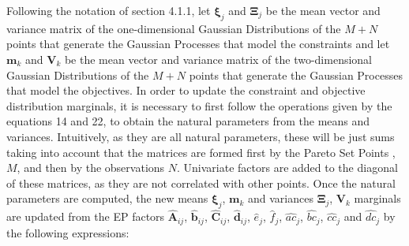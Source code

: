 \documentclass[review,preprint,12pt]{elsarticle}
\begin{document}
Following the notation of section 4.1.1, let $\boldsymbol{\xi}_j$ and $\boldsymbol{\Xi}_j$ be the mean vector and variance matrix of the one-dimensional Gaussian Distributions of the $M+N$ points that generate the Gaussian Processes that model the constraints and let $\boldsymbol{m}_{k}$ and $\boldsymbol{V}_{k}$ be the mean vector and variance matrix of the two-dimensional Gaussian Distributions of the $M+N$ points that generate the Gaussian Processes that model the objectives. In order to update the constraint and objective distribution marginals, it is necessary to first follow the operations given by the equations 14 and 22, to obtain the natural parameters from the means and variances. Intuitively, as they are all natural parameters, these will be just sums taking into account that the matrices are formed first by the Pareto Set Points ,$M$, and then by the observations $N$. Univariate factors are added to the diagonal of these matrices, as they are not correlated with other points. Once the natural parameters are computed, the new means $\boldsymbol{\xi}_j$, $\boldsymbol{m}_{k}$ and variances $\boldsymbol{\Xi}_j$, $\boldsymbol{V}_{k}$ marginals are updated from the EP factors $\hat{\boldsymbol{A}}_{ij}$, $\hat{\boldsymbol{b}}_{ij}$, $\hat{\boldsymbol{C}}_{ij}$, $\hat{\boldsymbol{d}}_{ij}$, $\hat{e}_{j}$, $\hat{f}_{j}$, $\hat{ac}_j$, $\hat{bc}_j$, $\hat{cc}_j$ and $\hat{dc}_j$ by the following expressions:
\end{document}
